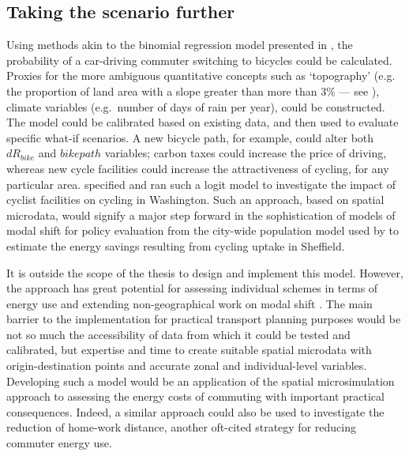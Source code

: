 \subsection{Taking the scenario further} \label{stfurther}
Using methods akin to the binomial regression model presented in %
\citet{Schoner2013}, the probability of a car-driving commuter switching to bicycles
could be calculated. Proxies for the more ambiguous quantitative concepts such as
`topography'
(e.g. the proportion of land area with a slope greater than more than 3\% ---
see \citep{Heinen2012}), climate variables (e.g.~number of days of rain per
year), could be constructed. The model could be calibrated based
on existing data, and then used to evaluate specific what-if scenarios.
A new bicycle path, for example, could alter both $dR_{bike}$ and $bikepath$
variables; carbon taxes could increase the price of driving, whereas new cycle
facilities could increase the attractiveness of cycling, for any particular area.
\citet{Buehler2012} specified and ran such a logit model to investigate the
impact of cyclist facilities on cycling in Washington.
Such an approach, based on
spatial microdata, would signify a major step forward
in the sophistication of models of modal shift for policy evaluation from the
city-wide population model used by \citet{Lovelace2011-assessing} to estimate the energy
savings resulting from cycling uptake in Sheffield.

It is outside the scope of the thesis to design and
implement this model. However, the approach has great potential for
assessing individual schemes in terms of energy use and extending
non-geographical work on modal shift \citep{Lovelace2011-assessing}. The main barrier
to the implementation for practical transport planning purposes
would be not so much the accessibility of data from which it could be tested
and calibrated, but expertise and time to create suitable spatial microdata
with origin-destination points and accurate zonal and individual-level
variables. Developing such a model would be an application of the spatial
microsimulation approach to assessing the energy costs of commuting with
important practical consequences. Indeed, a similar approach could also be used
to investigate the reduction of home-work distance, another oft-cited strategy
for reducing commuter energy use.

